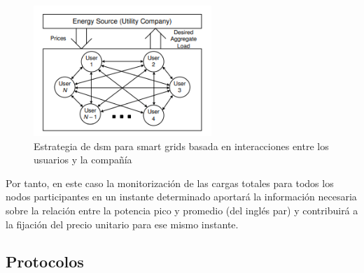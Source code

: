 \vspace{3mm}

\begin{figure}[h]
  \centering
  \includegraphics[width=0.6\textwidth]{img/teoria/dsm2.png}
  \caption{Estrategia de \gls{dsm} para smart grids basada en interacciones entre los usuarios y la compañía \cite{pricing}}
  \label{fig:dsm2}
\end{figure}

\vspace{3mm}

Por tanto, en este caso la monitorización de las cargas totales para todos los nodos participantes en un instante determinado aportará la información necesaria sobre la relación entre la potencia pico y promedio (del inglés \gls{par}) y contribuirá a la fijación del precio unitario para ese mismo instante. \cite{pricing} 


 
\cite{towards}



\vspace{3mm}






















\subsection{Protocolos}

